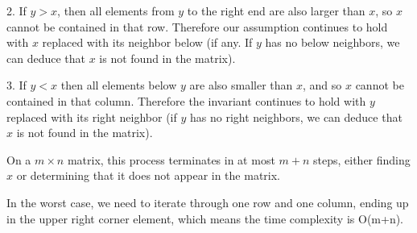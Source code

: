 2. If $y>x$, then all elements from $y$ to the right end are also larger than $x$, so $x$ cannot be contained in that row. Therefore our assumption continues to hold with $x$ replaced with its neighbor below (if any. If $y$ has no below neighbors, we can deduce that $x$ is not found in the matrix). 

3. If $y<x$ then all elements below $y$ are also smaller than $x$, and so $x$ cannot be contained in that column. Therefore the invariant continues to hold with $y$ replaced with its right neighbor (if $y$ has no right neighbors, we can deduce that $x$ is not found in the matrix).

On a $m \times n$ matrix, this process terminates in at most $m+n$ steps, either finding $x$ or determining that it does not appear in the matrix.


In the worst case, we need to iterate through one row and one column, ending up in the upper right corner element, which means the time complexity is O(m+n).

